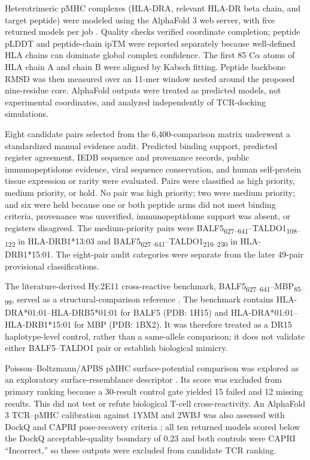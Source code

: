 \documentclass[11pt]{article}
\newcommand{\pep}[2]{#1\textsubscript{#2}}
\begin{document}
Heterotrimeric pMHC complexes (HLA-DRA, relevant HLA-DR beta chain, and target peptide) were modeled using the AlphaFold 3 web server, with five returned models per job \cite{af3}. Quality checks verified coordinate completion; peptide pLDDT and peptide-chain ipTM were reported separately because well-defined HLA chains can dominate global complex confidence. The first 85 C$\alpha$ atoms of HLA chain A and chain B were aligned by Kabsch fitting. Peptide backbone RMSD was then measured over an 11-mer window nested around the proposed nine-residue core. AlphaFold outputs were treated as predicted models, not experimental coordinates, and analyzed independently of TCR-docking simulations.

Eight candidate pairs selected from the 6,400-comparison matrix underwent a standardized manual evidence audit. Predicted binding support, predicted register agreement, IEDB sequence and provenance records, public immunopeptidome evidence, viral sequence conservation, and human self-protein tissue expression or rarity were evaluated. Pairs were classified as high priority, medium priority, or hold. No pair was high priority; two were medium priority; and six were held because one or both peptide arms did not meet binding criteria, provenance was unverified, immunopeptidome support was absent, or registers disagreed. The medium-priority pairs were \pep{BALF5}{627--641}--\pep{TALDO1}{108--122} in HLA-DRB1*13:03 and \pep{BALF5}{627--641}--\pep{TALDO1}{216--230} in HLA-DRB1*15:01. The eight-pair audit categories were separate from the later 49-pair provisional classifications.

The literature-derived Hy.2E11 cross-reactive benchmark, \pep{BALF5}{627--641}--\pep{MBP}{85--99}, served as a structural-comparison reference \cite{lang}. The benchmark contains HLA-DRA*01:01--HLA-DRB5*01:01 for BALF5 (PDB: 1H15) and HLA-DRA*01:01--HLA-DRB1*15:01 for MBP (PDB: 1BX2). It was therefore treated as a DR15 haplotype-level control, rather than a same-allele comparison; it does not validate either BALF5--TALDO1 pair or establish biological mimicry.

Poisson--Boltzmann/APBS pMHC surface-potential comparison was explored as an exploratory surface-resemblance descriptor \cite{apbs}. Its score was excluded from primary ranking because a 30-result control gate yielded 15 failed and 12 missing results. This did not test or refute biological T-cell cross-reactivity. An AlphaFold 3 TCR--pMHC calibration against 1YMM and 2WBJ was also assessed with DockQ and CAPRI pose-recovery criteria \cite{dockq,capri}; all ten returned models scored below the DockQ acceptable-quality boundary of 0.23 and both controls were CAPRI ``Incorrect,'' so these outputs were excluded from candidate TCR ranking.
\end{document}
